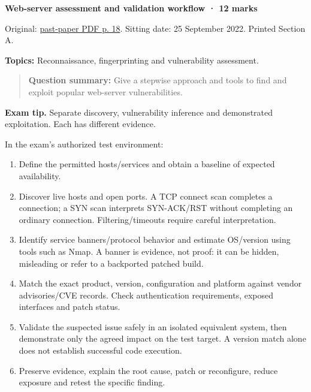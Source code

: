 \documentclass[11pt,a4paper]{article}
\begin{document}
\textbf{Web-server assessment and validation workflow · 12 marks}


Original: \href{../../CSE405-Security_Merged.pdf\#page=18}{past-paper PDF p. 18}. Sitting date: 25 September 2022. Printed Section A.


\textbf{Topics:} Reconnaissance,\allowbreak{} fingerprinting and vulnerability assessment.



\begin{quote}\small

\textbf{Question summary:} Give a stepwise approach and tools to find and exploit popular web-server vulnerabilities.



\end{quote}


{\color{ForestGreen}\textbf{Exam tip.} Separate discovery,\allowbreak{} vulnerability inference and demonstrated exploitation. Each has different evidence.}


In the exam's authorized test environment:



\begin{enumerate}

\item Define the permitted hosts/\allowbreak{}services and obtain a baseline of expected availability.

\item Discover live hosts and open ports. A TCP connect scan completes a connection; a SYN scan interprets SYN-ACK/\allowbreak{}RST without completing an ordinary connection. Filtering/\allowbreak{}timeouts require careful interpretation.

\item Identify service banners/\allowbreak{}protocol behavior and estimate OS/\allowbreak{}version using tools such as Nmap. A banner is evidence,\allowbreak{} not proof: it can be hidden,\allowbreak{} misleading or refer to a backported patched build.

\item Match the exact product,\allowbreak{} version,\allowbreak{} configuration and platform against vendor advisories/\allowbreak{}CVE records. Check authentication requirements,\allowbreak{} exposed interfaces and patch status.

\item Validate the suspected issue safely in an isolated equivalent system,\allowbreak{} then demonstrate only the agreed impact on the test target. A version match alone does not establish successful code execution.

\item Preserve evidence,\allowbreak{} explain the root cause,\allowbreak{} patch or reconfigure,\allowbreak{} reduce exposure and retest the specific finding.

\end{enumerate}
\end{document}

